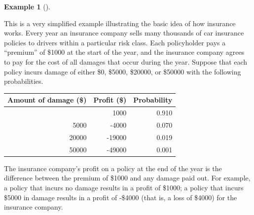 \documentclass[
  letterpaper,
  DIV=11,
  numbers=noendperiod]{scrreprt}
\theoremstyle{plain}
\theoremstyle{definition}
\newtheorem{example}{Example}[chapter]
\theoremstyle{definition}
\theoremstyle{definition}
\theoremstyle{remark}
\begin{document}
\begin{tcolorbox}[enhanced jigsaw, opacityback=0, left=2mm, colframe=quarto-callout-note-color-frame, toprule=.15mm, breakable, colback=white, leftrule=.75mm, arc=.35mm, rightrule=.15mm, bottomrule=.15mm]

\begin{example}[]\protect\hypertarget{exm-ev-insurance}{}\label{exm-ev-insurance}

This is a very simplified example illustrating the basic idea of how
insurance works. Every year an insurance company sells many thousands of
car insurance policies to drivers within a particular risk class. Each
policyholder pays a ``premium'' of \$1000 at the start of the year, and
the insurance company agrees to pay for the cost of all damages that
occur during the year. Suppose that each policy incurs damage of either
\$0, \$5000, \$20000, or \$50000 with the following probabilities.

\begin{longtable}[]{@{}rrr@{}}
\toprule\noalign{}
Amount of damage (\$) & Profit (\$) & Probability \\
\midrule\noalign{}
\endhead
\bottomrule\noalign{}
\endlastfoot
0 & 1000 & 0.910 \\
5000 & -4000 & 0.070 \\
20000 & -19000 & 0.019 \\
50000 & -49000 & 0.001 \\
\end{longtable}

The insurance company's profit on a policy at the end of the year is the
difference between the premium of \$1000 and any damage paid out. For
example, a policy that incurs no damage results in a profit of \$1000; a
policy that incurs \$5000 in damage results in a profit of -\$4000 (that
is, a loss of \$4000) for the insurance company.


\end{example}
\end{tcolorbox}
\end{document}
